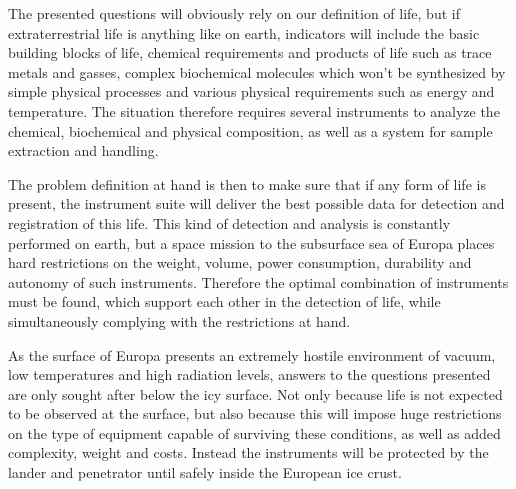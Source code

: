 The presented questions will obviously rely on our definition of life, but if extraterrestrial life is anything like on earth, indicators will include the basic building blocks of life, chemical requirements and products of life such as trace metals and gasses, complex biochemical molecules which won’t be synthesized by simple physical processes and various physical requirements such as energy and temperature. The situation therefore requires several instruments to analyze the chemical, biochemical and physical composition, as well as a system for sample extraction and handling.

The problem definition at hand is then to make sure that if any form of life is present, the instrument suite will deliver the best possible data for detection and registration of this life. This kind of detection and analysis is constantly performed on earth, but a space mission to the subsurface sea of Europa places hard restrictions on the weight, volume, power consumption, durability and autonomy of such instruments. Therefore the optimal combination of instruments must be found, which support each other in the detection of life, while simultaneously complying with the restrictions at hand. 

As the surface of Europa presents an extremely hostile environment of vacuum, low temperatures and high radiation levels, answers to the questions presented are only sought after below the icy surface. Not only because life is not expected to be observed at the surface, but also because this will impose huge restrictions on the type of equipment capable of surviving these conditions, as well as added complexity, weight and costs. Instead the instruments will be protected by the lander and penetrator until safely inside the European ice crust.




%


